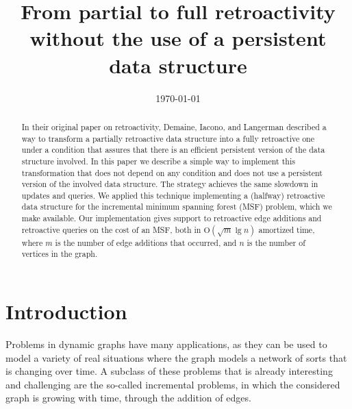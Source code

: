 \documentclass[reqno,11pt]{amsart}
\newcommand{\Oh}{\mathrm{O}}
\begin{document}
\title[From partial to full retroactivity without persistence]
{From partial to full retroactivity without the use of a persistent data structure}



\date{\today}

\begin{abstract}
In their original paper on retroactivity, Demaine, Iacono, and Langerman described 
a way to transform a partially retroactive data structure into a fully retroactive 
one under a condition that assures that there is an efficient persistent version 
of the data structure involved.  In this paper we describe a simple way to implement 
this transformation that does not depend on any condition and does not use a 
persistent version of the involved data structure.  The strategy achieves the 
same slowdown in updates and queries.  We applied this technique implementing a (halfway) 
retroactive data structure for the incremental minimum spanning forest (MSF) problem,
which we make available.  Our implementation gives support to retroactive edge additions 
and retroactive queries on the cost of an MSF, both in $\Oh(\sqrt{m}\lg n)$ amortized time, 
where $m$ is the number of edge additions that occurred, and $n$ is the number of 
vertices in the graph.
\end{abstract}


\maketitle

\section{Introduction}

Problems in dynamic graphs have many applications, as they can be used to model a variety 
of real situations where the graph models a network of sorts that is changing over time. 
A subclass of these problems that is already interesting and challenging are the so-called 
incremental problems, in which the considered graph is growing with time, through the 
addition of edges.  
\end{document}
